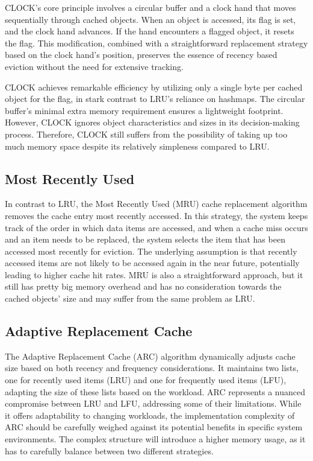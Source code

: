 \documentclass[journal,10.5pt,onecolumn]{IEEEtran}
\begin{document}
CLOCK's core principle involves a circular buffer and a clock hand that moves sequentially through cached objects. When an object is accessed, its flag is set, and the clock hand advances. If the hand encounters a flagged object, it resets the flag. This modification, combined with a straightforward replacement strategy based on the clock hand's position, preserves the essence of recency based eviction without the need for extensive tracking.

CLOCK achieves remarkable efficiency by utilizing only a single byte per cached object for the flag, in stark contrast to LRU's reliance on hashmaps. The circular buffer's minimal extra memory requirement ensures a lightweight footprint. However, CLOCK ignores object characteristics and sizes in its decision-making process. Therefore, CLOCK still suffers from the possibility of taking up too much memory space despite its relatively simpleness compared to LRU.

\subsection{Most Recently Used} 
In contrast to LRU, the Most Recently Used (MRU) cache replacement algorithm removes the cache entry most recently accessed. In this strategy, the system keeps track of the order in which data items are accessed, and when a cache miss occurs and an item needs to be replaced, the system selects the item that has been accessed most recently for eviction. The underlying assumption is that recently accessed items are not likely to be accessed again in the near future, potentially leading to higher cache hit rates. MRU is also a straightforward approach, but it still has pretty big memory overhead and has no consideration towards the cached objects' size and may suffer from the same problem as LRU.

\subsection{Adaptive Replacement Cache}
The Adaptive Replacement Cache (ARC) algorithm dynamically adjusts cache size based on both recency and frequency considerations. It maintains two lists, one for recently used items (LRU) and one for frequently used items (LFU), adapting the size of these lists based on the workload. ARC represents a nuanced compromise between LRU and LFU, addressing some of their limitations. While it offers adaptability to changing workloads, the implementation complexity of ARC should be carefully weighed against its potential benefits in specific system environments. The complex structure will introduce a higher memory usage, as it has to carefully balance between two different strategies.
\end{document}
